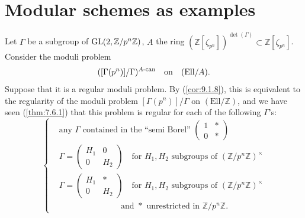 \section{Modular schemes as examples}
\label{sec:13.2}

\kmitem\label{item:13.2.1}
Let $\Gamma$ be a subgroup of $\operatorname{GL}(2, \mathbb{Z}/p^n\mathbb{Z})$, $A$ the ring $(\mathbb{Z}[\zeta_{p^n}])^{\det(\Gamma)} \subset \mathbb{Z}[\zeta_{p^n}]$. Consider the moduli problem
\[
([\Gamma(p^n)]/\Gamma)^{A\text{-\rm can}} \quad\text{on}\quad (\mathrm{Ell}/A) .
\]
Suppose that it is a regular moduli problem. By (\ref{cor:9.1.8}), this is equivalent to the regularity of the moduli problem $[\Gamma(p^n)]/\Gamma$ on $(\mathrm{Ell}/\mathbb{Z})$, and we have seen (\ref{thm:7.6.1}) that this problem is regular for each of the following $\Gamma$'s:
\[
\left\{
\begin{aligned}
&\text{any } \Gamma \text{ contained in the ``semi Borel'' } \begin{pmatrix} 1 & * \\ 0 & * \end{pmatrix} \\
&\Gamma = \begin{pmatrix} H_1 & 0 \\ 0 & H_2 \end{pmatrix} \quad\text{for } H_1, H_2 \text{ subgroups of } (\mathbb{Z}/p^n\mathbb{Z})^\times \\
&\Gamma = \begin{pmatrix} H_1 & * \\ 0 & H_2 \end{pmatrix} \quad\text{for } H_1, H_2 \text{ subgroups of } (\mathbb{Z}/p^n\mathbb{Z})^\times \\
&\qquad\qquad\qquad\quad\ \ \text{and } * \text{ unrestricted in } \mathbb{Z}/p^n\mathbb{Z} .
\end{aligned}
\right.
\]

